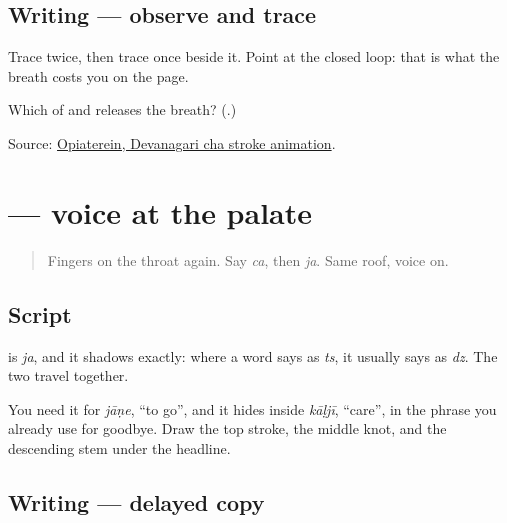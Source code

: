 \subsection*{Writing — observe and trace}

Trace \textbf{} twice, then trace \textbf{} once beside it. Point at the closed loop: that is what the breath costs you on the page.

\begin{tcolorbox}[breakable,colback=teal!4,colframe=teal!35!black,title={Before you move on}]
Which of \textbf{} and \textbf{} releases the breath? (\textbf{}.)

Source: \href{https://commons.wikimedia.org/wiki/File:Deva-\%E0\%A4\%9B-order.gif}{Opiaterein, Devanagari cha stroke animation}.
\end{tcolorbox}
\section[\texorpdfstring{\mr{ज} (ja)}{ज (ja)}]{ — voice at the palate}

\label{lesson:MR-W06-ja}



\begin{quote}
Fingers on the throat again. Say \emph{ca}, then \emph{ja}. Same roof, voice on.
\end{quote}

\subsection*{Script}
\begin{quote}
\end{quote}

\textbf{} is \emph{ja}, and it shadows \textbf{} exactly: where a word says \textbf{} as \emph{ts}, it usually says \textbf{} as \emph{dz}. The two travel together.

You need it for \emph{jāṇe}, \textquotedblleft{}to go\textquotedblright{}, and it hides inside \emph{kāḷjī}, \textquotedblleft{}care\textquotedblright{}, in the phrase you already use for goodbye. Draw the top stroke, the middle knot, and the descending stem under the headline.

\subsection*{Writing — delayed copy}

